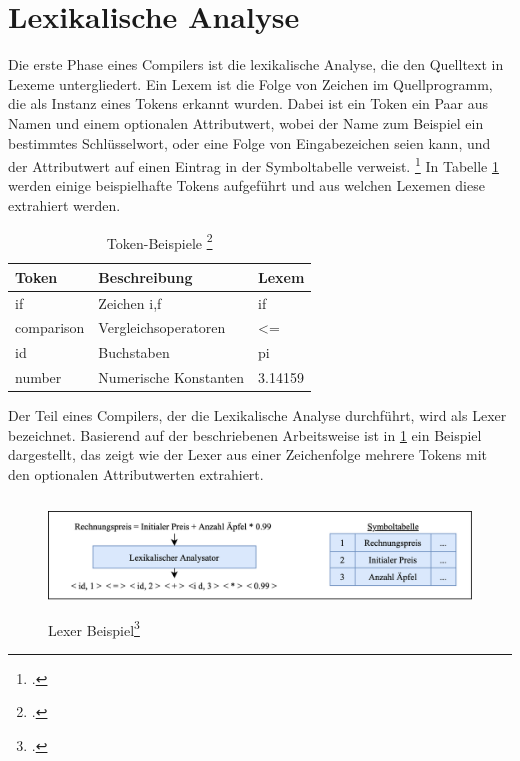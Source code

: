 \section{Lexikalische Analyse}
Die erste Phase eines Compilers ist die lexikalische Analyse,  die den Quelltext in Lexeme untergliedert.  Ein Lexem ist die Folge von Zeichen im Quellprogramm,  die als Instanz eines Tokens erkannt wurden.  Dabei ist ein Token ein Paar aus Namen und einem optionalen Attributwert,  wobei der Name zum Beispiel ein bestimmtes Schlüsselwort, oder eine Folge von Eingabezeichen seien kann, und der Attributwert auf einen Eintrag in der Symboltabelle verweist.  \footcite[Vgl.][S. 135 f.]{Ullmann2008} In Tabelle \ref{tab:Tokens} werden einige beispielhafte Tokens aufgeführt und aus welchen Lexemen diese extrahiert werden.

\begin{table}[!ht]
\begin{tabularx}{\textwidth}{l|X|l}
   \textbf{Token} & \textbf{Beschreibung} & \textbf{Lexem} \\
\hline
if             & Zeichen i,f           & if                      \\ 
comparison     & Vergleichsoperatoren  & \textless{}=            \\ 
id             & Buchstaben            & pi                      \\ 
number         & Numerische Konstanten    & 3.14159                  
\end{tabularx}
\caption[Token-Beispiele]{Token-Beispiele \protect\footcite{Ullmann2008}}
 \label{tab:Tokens}
\end{table}

Der Teil eines Compilers,  der die Lexikalische Analyse durchführt,  wird als Lexer bezeichnet.  Basierend auf der beschriebenen Arbeitsweise ist in \ref{fig:LexerResult} ein Beispiel dargestellt, das zeigt wie der Lexer aus einer Zeichenfolge mehrere Tokens mit den optionalen Attributwerten extrahiert.  
 
\begin{figure}[!ht]
 \includegraphics[width=14.5cm,height=3cm]{Images/Compiler/LexerResult.png}
 \caption[Lexer Beispiel]{Lexer Beispiel\protect\footcite{Ullmann2008}}
 \label{fig:LexerResult}
\end{figure}

